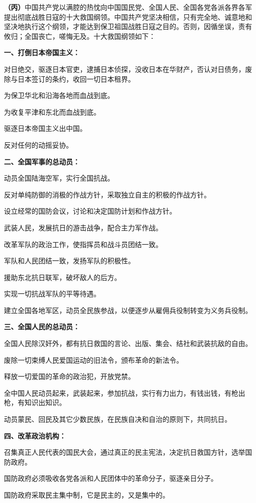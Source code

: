 \textbf{（丙）}中国共产党以满腔的热忱向中国国民党、全国人民、全国各党各派各界各军提出彻底战胜日寇的十大救国纲领。中国共产党坚决相信，只有完全地、诚意地和坚决地执行这个纲领，才能达到保卫祖国战胜日寇之目的。否则，因循坐误，责有攸归；全国丧亡，嗟悔无及。十大救国纲领如下：


\textbf{一、打倒日本帝国主义：}

对日绝交，驱逐日本官吏，逮捕日本侦探，没收日本在华财产，否认对日债务，废除与日本签订的条约，收回一切日本租界。

为保卫华北和沿海各地而血战到底。

为收复平津和东北而血战到底。

驱逐日本帝国主义出中国。

反对任何的动摇妥协。


\textbf{二、全国军事的总动员：}

动员全国陆海空军，实行全国抗战。

反对单纯防御的消极的作战方针，采取独立自主的积极的作战方针。

设立经常的国防会议，讨论和决定国防计划和作战方针。

武装人民，发展抗日的游击战争，配合主力军作战。

改革军队的政治工作，使指挥员和战斗员团结一致。

军队和人民团结一致，发扬军队的积极性。

援助东北抗日联军，破坏敌人的后方。

实现一切抗战军队的平等待遇。

建立全国各地军区，动员全民族参战，以便逐步从雇佣兵役制转变为义务兵役制。


\textbf{三、全国人民的总动员：}

全国人民除汉奸外，都有抗日救国的言论、出版、集会、结社和武装抗敌的自由。

废除一切束缚人民爱国运动的旧法令，颁布革命的新法令。

释放一切爱国的革命的政治犯，开放党禁。

全中国人民动员起来，武装起来，参加抗战，实行有力出力，有钱出钱，有枪出枪，有知识出知识。

动员蒙民、回民及其它少数民族，在民族自决和自治的原则下，共同抗日。


\textbf{四、改革政治机构：}

召集真正人民代表的国民大会，通过真正的民主宪法，决定抗日救国方针，选举国防政府。

国防政府必须吸收各党各派和人民团体中的革命分子，驱逐亲日分子。

国防政府采取民主集中制，它是民主的，又是集中的。

